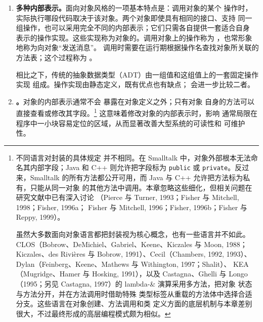\begin{enumerate}
\item \textbf{多种内部表示。}面向对象风格的一项基本特点是：调用对象的某个
  操作时，实际执行哪段代码取决于该对象。两个对象即使具有相同的接口、支持
  同一组操作，也可以采用完全不同的内部表示；它们只需各自提供一套适合自身
  表示的操作实现。这些实现称为对象的。调用对象上的操作称为
  ，也常形象地称为向对象“发送消息”。
  调用时需要在运行期根据操作名查找对象所关联的方法表；这个过程称为
  。

  相比之下，传统的抽象数据类型（ADT）由一组值和这组值上的一套固定操作实现
  组成。操作实现由静态定义，既有优点也有缺点；
  会进一步比较二者。


\item \textbf{。}对象的内部表示通常不会
  暴露在对象定义之外；只有对象
  自身的方法可以直接查看或修改其字段。\footnote{\label{fn:18.1:encapsulation}不同语言对封装的具体规定
  并不相同。在 Smalltalk 中，对象外部根本无法命名其内部字段；Java 和 C++
  则允许把字段标为 \texttt{public} 或 \texttt{private}。反过来，Smalltalk
  的所有方法都公开可用，而 Java 与 C++ 允许把方法标为私有，只能从同一对象
  的其他方法中调用。本章忽略这些细化，但相关问题在研究文献中已有深入讨论
  （Pierce 与 Turner, 1993；Fisher 与 Mitchell, 1998；Fisher, 1996a；
  Fisher 与 Mitchell, 1996；Fisher, 1996b；Fisher 与 Reppy, 1999）。

  虽然大多数面向对象语言都把封装视为核心概念，也有一些语言并不如此。
  CLOS（Bobrow、DeMichiel、Gabriel、Keene、Kiczales 与 Moon, 1988；
  Kiczales、des Rivières 与 Bobrow, 1991）、Cecil（Chambers, 1992,
  1993）、Dylan（Feinberg、Keene、Mathews 与 Withington, 1997；Shalit）、
  KEA（Mugridge、Hamer 与 Hosking, 1991），以及 Castagna、Ghelli 与
  Longo（1995；另见 Castagna, 1997）的 lambda-\& 演算采用多方法，把对象
  状态与方法分开，并在方法调用时借助特殊
  类型标签从重载的方法体中选择合适分支。这些语言在对象创建、方法调用和类
  定义方面的底层机制与本章差别很大，不过最终形成的高层编程模式颇为相似。}
  这意味着修改对象的内部表示时，影响
  通常局限在程序中一小块容易定位的区域，从而显著改善大型系统的可读性和
  可维护性。


\end{enumerate}
